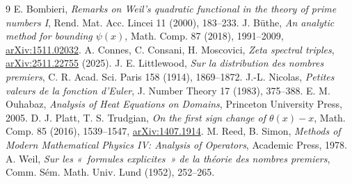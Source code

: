\documentclass[11pt,a4paper]{article}
\theoremstyle{definition}
\theoremstyle{remark}
\begin{document}
\begin{thebibliography}{9}
 E. Bombieri, \emph{Remarks on Weil's quadratic functional in the theory of prime numbers I}, Rend. Mat. Acc. Lincei 11 (2000), 183--233.
 J. Büthe, \emph{An analytic method for bounding $\psi(x)$}, Math. Comp. 87 (2018), 1991--2009, \href{https://arxiv.org/abs/1511.02032}{arXiv:1511.02032}.
 A. Connes, C. Consani, H. Moscovici, \emph{Zeta spectral triples}, \href{https://arxiv.org/abs/2511.22755}{arXiv:2511.22755} (2025).
 J. E. Littlewood, \emph{Sur la distribution des nombres premiers}, C. R. Acad. Sci. Paris 158 (1914), 1869--1872.
 J.-L. Nicolas, \emph{Petites valeurs de la fonction d'Euler}, J. Number Theory 17 (1983), 375--388.
 E. M. Ouhabaz, \emph{Analysis of Heat Equations on Domains}, Princeton University Press, 2005.
 D. J. Platt, T. S. Trudgian, \emph{On the first sign change of $\theta(x)-x$}, Math. Comp. 85 (2016), 1539--1547, \href{https://arxiv.org/abs/1407.1914}{arXiv:1407.1914}.
 M. Reed, B. Simon, \emph{Methods of Modern Mathematical Physics IV: Analysis of Operators}, Academic Press, 1978.
 A. Weil, \emph{Sur les «~formules explicites~» de la théorie des nombres premiers}, Comm. Sém. Math. Univ. Lund (1952), 252--265.
\end{thebibliography}
\end{document}
